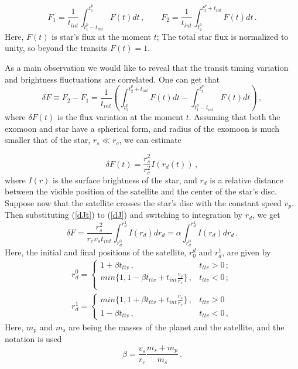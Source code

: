 \documentclass[12pt]{article}
\begin{document}
 \begin{equation}\label{J1J2}
F_1=\frac{1}{t_{int}}\int_{t^p_1-t_{int}}^{t^p_1} F(t)dt \,,\qquad F_2=\frac{1}{t_{int}}\int_{t^p_2}^{t^p_2+t_{int}} F(t)dt \,.
\end{equation}
Here, $F(t)$ is star's flux at the moment $t$; The total star flux is normalized to unity, so beyond the transits \mbox{$F(t)=1$}.

As a main observation we would like to reveal that the transit timing variation and brightness fluctuations are correlated. One can get that
\begin{equation}\label{dJ}
\delta F\equiv F_2-F_1=\frac{1}{t_{int}}\left(\int_{t^p_2}^{t^p_2+t_{int}}  F(t)dt-
\int_{t^p_1-t_{int}}^{t^p_1}  F(t)dt\right)\,,
\end{equation}
where $\delta F(t)$ is the flux variation at the moment $t$. Assuming that both the exomoon and star have a spherical form, and radius of the exomoon is much smaller that of the star, $r_s\ll r_c$, we can estimate
 
 \begin{equation}\label{dJt}
\delta F(t)=\frac{r^2_s}{r^2_c}I(r_d(t))\,,
\end{equation}
where $I(r)$ is the surface brightness of the star, and $r_d$ is a relative distance between the visible position of the satellite and the center of the star's disc. Suppose now that the satellite crosses the star's disc with the constant speed $v_p$. Then substituting (\ref{dJt}) to (\ref{dJ}) and switching to integration by $r_d$, we get
\begin{equation}\label{dF}
\delta F=\frac{r^2_s}{r_c v_s t_{int}}\int_{r^0_d}^{r^1_d}I(r_d)dr_d=\alpha\int_{r^0_d}^{r^1_d}I(r_d)dr_d\,.
\end{equation}
 Here, the initial and final positions of the satellite, $r_0^d$ and $r^1_d$, are given by
\begin{equation}\label{r01}\begin{array}{ll}
r_d^0=\left\{%
\begin{array}{ll}
    \displaystyle 1+\beta t_{{ttv}}\,, & t_{{ttv}}>0\,;  \\[1mm]
    \displaystyle {min}\{1,1-\beta t_{{ttv}}+t_{int} \frac{v_s}{r_c}\}\,,& t_{{ttv}}<0\,; \\
\end{array}%
\right.\\[7mm]
r_d^1=\left\{%
\begin{array}{ll}
    \displaystyle {min}\{1,1+\beta t_{{ttv}}+t_{int} \frac{v_s}{r_c}\}\,, & t_{ttv}>0\, \\[1mm]
    \displaystyle 1-\beta t_{ttv}\,, &   t_{ttv}<0\,,
\end{array}%
\right.
\end{array}\end{equation}
Here, $m_p$ and $m_s$ are being the masses of the planet and the satellite, and the notation is used
\begin{equation}\label{beta}
\beta=\frac{v_s}{r_c}\frac{m_s+m_p}{m_s}\,.
\end{equation}
 
\end{document}
